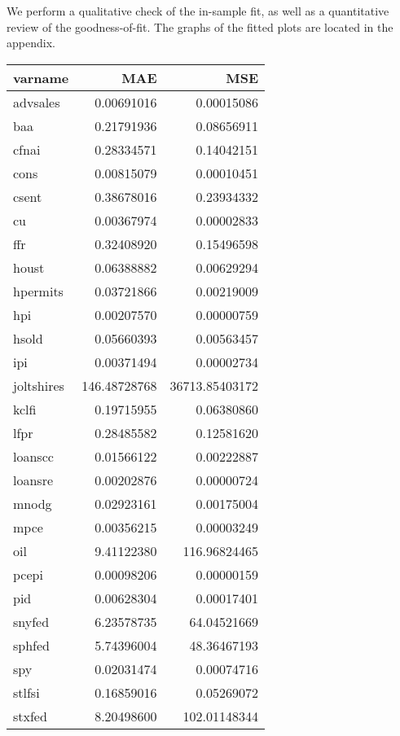 \documentclass[11pt, letterpaper]{article}\usepackage[]{graphicx}\usepackage[]{color}
\begin{document}
We perform a qualitative check of the in-sample fit, as well as a quantitative review of the goodness-of-fit. The graphs of the fitted plots are located in the appendix.
\begin{table}[H]
\centering
\begingroup\footnotesize
\begin{tabular}{lrr}
  \hline
varname & MAE & MSE \\ 
  \hline
advsales & 0.00691016 & 0.00015086 \\ 
  baa & 0.21791936 & 0.08656911 \\ 
  cfnai & 0.28334571 & 0.14042151 \\ 
  cons & 0.00815079 & 0.00010451 \\ 
  csent & 0.38678016 & 0.23934332 \\ 
  cu & 0.00367974 & 0.00002833 \\ 
  ffr & 0.32408920 & 0.15496598 \\ 
  houst & 0.06388882 & 0.00629294 \\ 
  hpermits & 0.03721866 & 0.00219009 \\ 
  hpi & 0.00207570 & 0.00000759 \\ 
  hsold & 0.05660393 & 0.00563457 \\ 
  ipi & 0.00371494 & 0.00002734 \\ 
  joltshires & 146.48728768 & 36713.85403172 \\ 
  kclfi & 0.19715955 & 0.06380860 \\ 
  lfpr & 0.28485582 & 0.12581620 \\ 
  loanscc & 0.01566122 & 0.00222887 \\ 
  loansre & 0.00202876 & 0.00000724 \\ 
  mnodg & 0.02923161 & 0.00175004 \\ 
  mpce & 0.00356215 & 0.00003249 \\ 
  oil & 9.41122380 & 116.96824465 \\ 
  pcepi & 0.00098206 & 0.00000159 \\ 
  pid & 0.00628304 & 0.00017401 \\ 
  snyfed & 6.23578735 & 64.04521669 \\ 
  sphfed & 5.74396004 & 48.36467193 \\ 
  spy & 0.02031474 & 0.00074716 \\ 
  stlfsi & 0.16859016 & 0.05269072 \\ 
  stxfed & 8.20498600 & 102.01148344 \\ 

\end{tabular}
\end{table}
\end{document}
